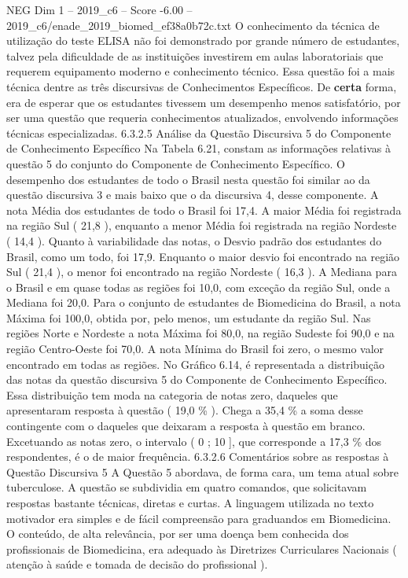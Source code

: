 \begin{textsample}{NEG Dim 1 – 2019\_c6 – Score -6.00 – 2019\_c6/enade\_2019\_biomed\_ef38a0b72c.txt}
O conhecimento da técnica de utilização do teste ELISA não foi demonstrado por grande número de estudantes, talvez pela dificuldade de as instituições investirem em aulas laboratoriais que requerem equipamento moderno e conhecimento técnico.
Essa questão foi a mais técnica dentre as três discursivas de Conhecimentos Específicos.
De \textbf{certa} forma, era de esperar que os estudantes tivessem um desempenho menos satisfatório, por ser uma questão que requeria conhecimentos atualizados, envolvendo informações técnicas especializadas. 6.3.2.5 Análise da Questão Discursiva 5 do Componente de Conhecimento Específico Na Tabela 6.21, constam as informações relativas à questão 5 do conjunto do Componente de Conhecimento Específico.
O desempenho dos estudantes de todo o Brasil nesta questão foi similar ao da questão discursiva 3 e mais baixo que o da discursiva 4, desse componente.
A nota Média dos estudantes de todo o Brasil foi 17,4.
A maior Média foi registrada na região Sul ( 21,8 ), enquanto a menor Média foi registrada na região Nordeste ( 14,4 ).
Quanto à variabilidade das notas, o Desvio padrão dos estudantes do Brasil, como um todo, foi 17,9.
Enquanto o maior desvio foi encontrado na região Sul ( 21,4 ), o menor foi encontrado na região Nordeste ( 16,3 ).
A Mediana para o Brasil e em quase todas as regiões foi 10,0, com exceção da região Sul, onde a Mediana foi 20,0.
Para o conjunto de estudantes de Biomedicina do Brasil, a nota Máxima foi 100,0, obtida por, pelo menos, um estudante da região Sul.
Nas regiões Norte e Nordeste a nota Máxima foi 80,0, na região Sudeste foi 90,0 e na região Centro-Oeste foi 70,0.
A nota Mínima do Brasil foi zero, o mesmo valor encontrado em todas as regiões.
No Gráfico 6.14, é representada a distribuição das notas da questão discursiva 5 do Componente de Conhecimento Específico.
Essa distribuição tem moda na categoria de notas zero, daqueles que apresentaram resposta à questão ( 19,0 \% ).
Chega a 35,4 \% a soma desse contingente com o daqueles que deixaram a resposta à questão em branco.
Excetuando as notas zero, o intervalo ( 0 ; 10 ], que corresponde a 17,3 \% dos respondentes, é o de maior frequência. 6.3.2.6 Comentários sobre as respostas à Questão Discursiva 5 A Questão 5 abordava, de forma cara, um tema atual sobre tuberculose.
A questão se subdividia em quatro comandos, que solicitavam respostas bastante técnicas, diretas e curtas.
A linguagem utilizada no texto motivador era simples e de fácil compreensão para graduandos em Biomedicina.
O conteúdo, de alta relevância, por ser uma doença bem conhecida dos profissionais de Biomedicina, era adequado às Diretrizes Curriculares Nacionais ( atenção à saúde e tomada de decisão do profissional ).

\end{textsample}
